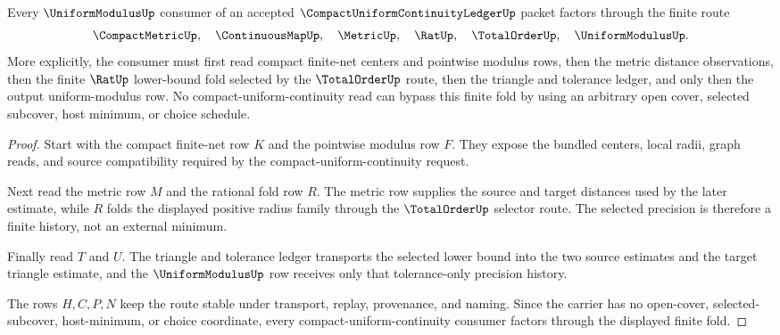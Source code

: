\begin{theorem}
\label{thm:compact-uniform-continuity-ledger-finite-fold-route}
Every $\UniformModulusUp$ consumer of an accepted $\CompactUniformContinuityLedgerUp$ packet factors through the finite route
$$
\CompactMetricUp,\quad \ContinuousMapUp,\quad \MetricUp,\quad \RatUp,\quad \TotalOrderUp,\quad \UniformModulusUp .
$$
More explicitly, the consumer must first read compact finite-net centers and pointwise modulus rows, then the metric distance observations, then the finite $\RatUp$ lower-bound fold selected by the $\TotalOrderUp$ route, then the triangle and tolerance ledger, and only then the output uniform-modulus row. No compact-uniform-continuity read can bypass this finite fold by using an arbitrary open cover, selected subcover, host minimum, or choice schedule.
\end{theorem}
\begin{proof}
Start with the compact finite-net row $K$ and the pointwise modulus row $F$. They expose the bundled centers, local radii, graph reads, and source compatibility required by the compact-uniform-continuity request.

Next read the metric row $M$ and the rational fold row $R$. The metric row supplies the source and target distances used by the later estimate, while $R$ folds the displayed positive radius family through the $\TotalOrderUp$ selector route. The selected precision is therefore a finite history, not an external minimum.

Finally read $T$ and $U$. The triangle and tolerance ledger transports the selected lower bound into the two source estimates and the target triangle estimate, and the $\UniformModulusUp$ row receives only that tolerance-only precision history.

The rows $H,C,P,N$ keep the route stable under transport, replay, provenance, and naming. Since the carrier has no open-cover, selected-subcover, host-minimum, or choice coordinate, every compact-uniform-continuity consumer factors through the displayed finite fold.
\end{proof}


